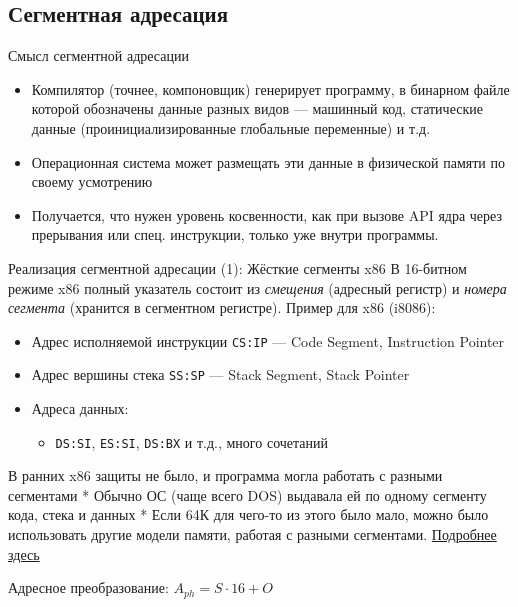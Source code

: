 \documentclass[xetex,aspectratio=43]{beamer}
\begin{document}
\subsection{Сегментная адресация}

\begin{frame}{Смысл сегментной адресации}
    \begin{itemize}
        \item
        Компилятор (точнее, компоновщик) генерирует программу, в бинарном
        файле которой обозначены данные разных видов --- машинный код,
        статические данные (проинициализированные глобальные переменные) и
        т.д.
        \item
        Операционная система может размещать эти данные в физической памяти по
        своему усмотрению
        \item
        Получается, что нужен уровень косвенности, как при вызове API ядра
        через прерывания или спец. инструкции, только уже внутри программы.
    \end{itemize}
\end{frame}

\begin{frame}[fragile]{Реализация сегментной адресации (1): Жёсткие сегменты x86}
    В 16-битном режиме x86 полный указатель состоит из \emph{смещения}
    (адресный регистр) и \emph{номера сегмента} (хранится в сегментном
    регистре). Пример для x86 (i8086):

    \begin{itemize}
        \tightlist
        \item
        Адрес исполняемой инструкции \texttt{CS:IP} --- Code Segment,
        Instruction Pointer
        \item
        Адрес вершины стека \texttt{SS:SP} --- Stack Segment, Stack Pointer
        \item
        Адреса данных:

        \begin{itemize}
            \tightlist
            \item
            \texttt{DS:SI}, \texttt{ES:SI}, \texttt{DS:BX} и т.д., много
            сочетаний
        \end{itemize}
    \end{itemize}

    В ранних x86 защиты не было, и программа могла работать с разными
    сегментами * Обычно ОС (чаще всего DOS) выдавала ей по одному сегменту
    кода, стека и данных * Если 64К для чего-то из этого было мало, можно
    было использовать другие модели памяти, работая с разными сегментами.
    \href{http://www.c-jump.com/CIS77/ASM/Directives/D77_0030_models.htm}{Подробнее
        здесь}

    Адресное преобразование: \(A_{ph} = S \cdot 16 + O\)
\end{frame}
\end{document}
